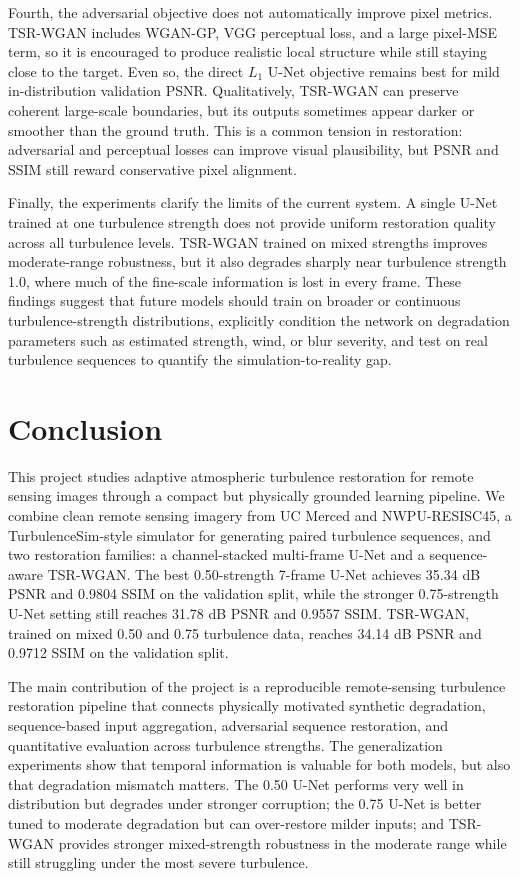 \documentclass{article}
\begin{document}
Fourth, the adversarial objective does not automatically improve pixel metrics. TSR-WGAN includes WGAN-GP, VGG perceptual loss, and a large pixel-MSE term, so it is encouraged to produce realistic local structure while still staying close to the target. Even so, the direct $L_1$ U-Net objective remains best for mild in-distribution validation PSNR. Qualitatively, TSR-WGAN can preserve coherent large-scale boundaries, but its outputs sometimes appear darker or smoother than the ground truth. This is a common tension in restoration: adversarial and perceptual losses can improve visual plausibility, but PSNR and SSIM still reward conservative pixel alignment.

Finally, the experiments clarify the limits of the current system. A single U-Net trained at one turbulence strength does not provide uniform restoration quality across all turbulence levels. TSR-WGAN trained on mixed strengths improves moderate-range robustness, but it also degrades sharply near turbulence strength 1.0, where much of the fine-scale information is lost in every frame. These findings suggest that future models should train on broader or continuous turbulence-strength distributions, explicitly condition the network on degradation parameters such as estimated strength, wind, or blur severity, and test on real turbulence sequences to quantify the simulation-to-reality gap.

\section{Conclusion}
This project studies adaptive atmospheric turbulence restoration for remote sensing images through a compact but physically grounded learning pipeline. We combine clean remote sensing imagery from UC Merced and NWPU-RESISC45, a TurbulenceSim-style simulator for generating paired turbulence sequences, and two restoration families: a channel-stacked multi-frame U-Net and a sequence-aware TSR-WGAN. The best 0.50-strength 7-frame U-Net achieves 35.34 dB PSNR and 0.9804 SSIM on the validation split, while the stronger 0.75-strength U-Net setting still reaches 31.78 dB PSNR and 0.9557 SSIM. TSR-WGAN, trained on mixed 0.50 and 0.75 turbulence data, reaches 34.14 dB PSNR and 0.9712 SSIM on the validation split.

The main contribution of the project is a reproducible remote-sensing turbulence restoration pipeline that connects physically motivated synthetic degradation, sequence-based input aggregation, adversarial sequence restoration, and quantitative evaluation across turbulence strengths. The generalization experiments show that temporal information is valuable for both models, but also that degradation mismatch matters. The 0.50 U-Net performs very well in distribution but degrades under stronger corruption; the 0.75 U-Net is better tuned to moderate degradation but can over-restore milder inputs; and TSR-WGAN provides stronger mixed-strength robustness in the moderate range while still struggling under the most severe turbulence.
\end{document}

